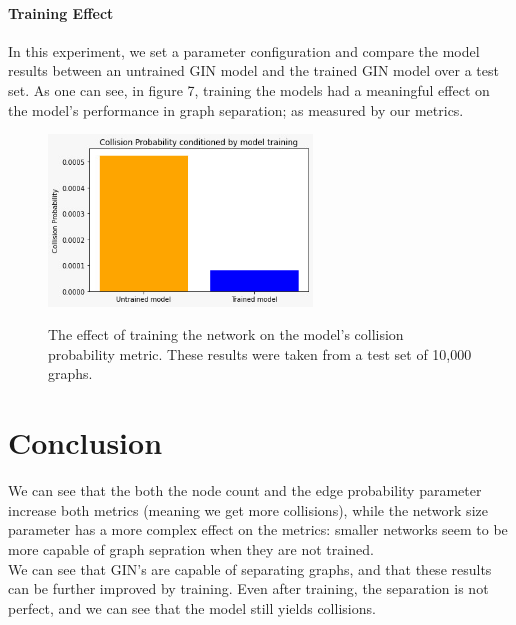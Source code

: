 \documentclass{article}
\begin{document}
\subsection*{Training Effect}
In this experiment, we set a parameter configuration and compare the model results between an untrained GIN model
and the trained GIN model over a test set.
As one can see, in figure 7, training the models had a
meaningful effect on the model's performance in graph separation; as measured by our metrics.
\begin{figure}
    \begin{center}
        \includegraphics[width=7cm]{../figures/Training_Performance_Bars.png}\\
        \caption{The effect of training the network on the model's collision probability metric.
        These results were taken from a test set of 10,000 graphs.}
    \end{center}
\end{figure}    


\part*{Conclusion}
We can see that the both the node count and the edge probability parameter increase both metrics (meaning we get more collisions),
while the network size parameter has a more complex effect on the metrics: smaller networks seem to be more capable of graph sepration
when they are not trained.\\
We can see that GIN's are capable of separating graphs, and that these results can be further improved by training.
Even after training, the separation is not perfect, and we can see that the model still yields collisions.
\end{document}
